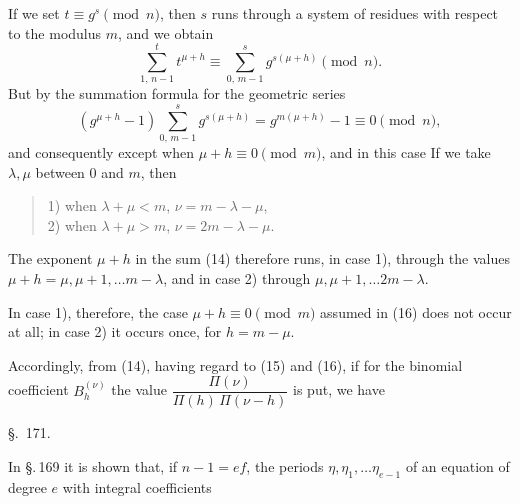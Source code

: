 
If we set $t \equiv g^s \pmod{n}$, then $s$ runs through a system of residues with respect to the modulus $m$, and we obtain
\[
\sum_{1,\,n-1}^{t} t^{\mu+h} \equiv \sum_{0,\,m-1}^{s} g^{s(\mu+h)} \pmod{n}.
\]
But by the summation formula for the geometric series
\[
(g^{\mu+h} - 1) \sum_{0,\,m-1}^{s} g^{s(\mu+h)} = g^{m(\mu+h)} - 1 \equiv 0 \pmod{n},
\]
and consequently
except when $\mu + h \equiv 0 \pmod{m}$, and in this case
If we take $\lambda, \mu$ between $0$ and $m$, then
\begin{quote}
1) when $\lambda + \mu < m$, \quad $\nu = m - \lambda - \mu$,\\
2) when $\lambda + \mu > m$, \quad $\nu = 2m - \lambda - \mu$.
\end{quote}
The exponent $\mu + h$ in the sum (14) therefore runs, in case 1), through the values $\mu + h = \mu, \mu + 1, \ldots m - \lambda$, and in case 2) through $\mu, \mu + 1, \ldots 2m - \lambda$.

In case 1), therefore, the case $\mu + h \equiv 0 \pmod{m}$ assumed in (16) does not occur at all; in case 2) it occurs once, for $h = m - \mu$.

Accordingly, from (14), having regard to (15) and (16), if for the binomial coefficient $B_h^{(\nu)}$ the value $\dfrac{\Pi(\nu)}{\Pi(h)\,\Pi(\nu-h)}$ is put, we have

\begin{center}
\S.\ 171.

\end{center}

In \S.\,169 it is shown that, if $n - 1 = ef$, the periods $\eta, \eta_1, \ldots \eta_{e-1}$ of an equation of degree $e$ with integral coefficients
